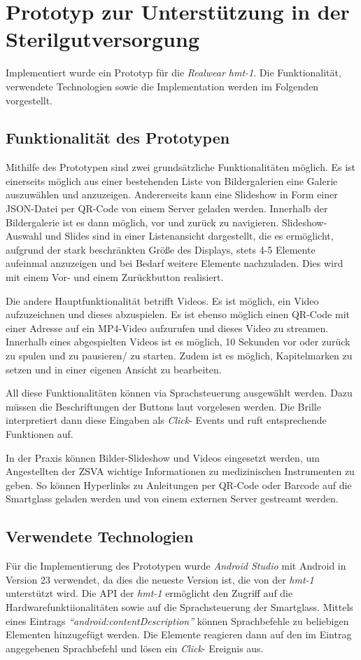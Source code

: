 %
%
%
%
%
%
\chapter{Prototyp zur Unterstützung in der Sterilgutversorgung}
\label{ch:Prototyp}
Implementiert wurde ein Prototyp für die \emph{Realwear hmt-1}. Die Funktionalität, verwendete Technologien sowie die Implementation werden im Folgenden vorgestellt.
%
%
\section{Funktionalität des Prototypen}
Mithilfe des Prototypen sind zwei grundsätzliche Funktionalitäten möglich. Es ist einerseits möglich aus einer bestehenden Liste von Bildergalerien eine Galerie auszuwählen und anzuzeigen. Andererseits kann eine Slideshow in Form einer JSON-Datei per QR-Code von einem Server geladen werden. Innerhalb der Bildergalerie ist es dann möglich, vor und zurück zu navigieren. Slideshow-Auswahl und Slides sind in einer Listenansicht dargestellt, die es ermöglicht, aufgrund der stark beschränkten Größe des Displays, stets 4-5 Elemente aufeinmal anzuzeigen und bei Bedarf weitere Elemente nachzuladen. Dies wird mit einem Vor- und einem Zurückbutton realisiert.

Die andere Hauptfunktionalität betrifft Videos. Es ist möglich, ein Video aufzuzeichnen und dieses abzuspielen. Es ist ebenso möglich einen QR-Code mit einer Adresse auf ein MP4-Video aufzurufen und dieses Video zu streamen. Innerhalb eines abgespielten Videos ist es möglich, 10 Sekunden vor oder zurück zu spulen und zu pausieren/ zu starten. Zudem ist es möglich, Kapitelmarken zu setzen und in einer eigenen Ansicht zu bearbeiten.

All diese Funktionalitäten können via Sprachsteuerung ausgewählt werden. Dazu müssen die Beschriftungen der Buttons laut vorgelesen werden. Die Brille interpretiert dann diese Eingaben als \emph{Click}- Events und ruft entsprechende Funktionen auf.

In der Praxis können Bilder-Slideshow und Videos eingesetzt werden, um Angestellten der ZSVA wichtige Informationen zu medizinischen Instrumenten zu geben. So können Hyperlinks zu Anleitungen per QR-Code oder Barcode auf die Smartglass geladen werden und von einem externen Server gestreamt werden.
%
%
%
%
%
%
\section{Verwendete Technologien}
\label{sec:Verwendete_Technologien}
Für die Implementierung des Prototypen wurde \emph{Android Studio} mit Android in Version 23 verwendet, da dies die neueste Version ist, die von der \emph{hmt-1} unterstützt wird. Die API der \emph{hmt-1} ermöglicht den Zugriff auf die Hardwarefunktiionalitäten sowie auf die Sprachsteuerung der Smartglass. Mittels eines Eintrags \emph{\enquote{android:contentDescription}} können Sprachbefehle zu beliebigen Elementen hinzugefügt werden. Die Elemente reagieren dann auf den im Eintrag angegebenen Sprachbefehl und lösen ein \emph{Click}- Ereignis aus.

